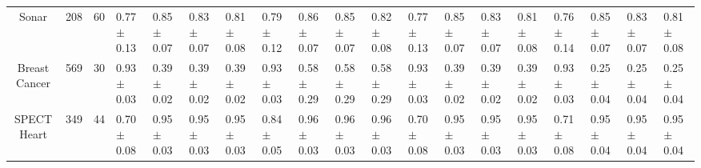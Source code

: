 \begin{table}[H]
\begin{tabular}{cccllllllllllllllll}
Sonar & 208 & 60 & 0.77 $\pm$ 0.13 & 0.85 $\pm$ 0.07 & 0.83 $\pm$ 0.07 & 0.81 $\pm$ 0.08 & 0.79 $\pm$ 0.12 & 0.86 $\pm$ 0.07 & 0.85 $\pm$ 0.07 & 0.82 $\pm$ 0.08 & 0.77 $\pm$ 0.13 & 0.85 $\pm$ 0.07 & 0.83 $\pm$ 0.07 & 0.81 $\pm$ 0.08 & 0.76 $\pm$ 0.14 & 0.85 $\pm$ 0.07 & 0.83 $\pm$ 0.07 & 0.81 $\pm$ 0.08 \\
Breast Cancer & 569 & 30 & 0.93 $\pm$ 0.03 & 0.39 $\pm$ 0.02 & 0.39 $\pm$ 0.02 & 0.39 $\pm$ 0.02 & 0.93 $\pm$ 0.03 & 0.58 $\pm$ 0.29 & 0.58 $\pm$ 0.29 & 0.58 $\pm$ 0.29 & 0.93 $\pm$ 0.03 & 0.39 $\pm$ 0.02 & 0.39 $\pm$ 0.02 & 0.39 $\pm$ 0.02 & 0.93 $\pm$ 0.03 & 0.25 $\pm$ 0.04 & 0.25 $\pm$ 0.04 & 0.25 $\pm$ 0.04 \\
SPECT Heart & 349 & 44 & 0.70 $\pm$ 0.08 & 0.95 $\pm$ 0.03 & 0.95 $\pm$ 0.03 & 0.95 $\pm$ 0.03 & 0.84 $\pm$ 0.05 & 0.96 $\pm$ 0.03 & 0.96 $\pm$ 0.03 & 0.96 $\pm$ 0.03 & 0.70 $\pm$ 0.08 & 0.95 $\pm$ 0.03 & 0.95 $\pm$ 0.03 & 0.95 $\pm$ 0.03 & 0.71 $\pm$ 0.08 & 0.95 $\pm$ 0.04 & 0.95 $\pm$ 0.04 & 0.95 $\pm$ 0.04 \\
\end{tabular}
\end{table}